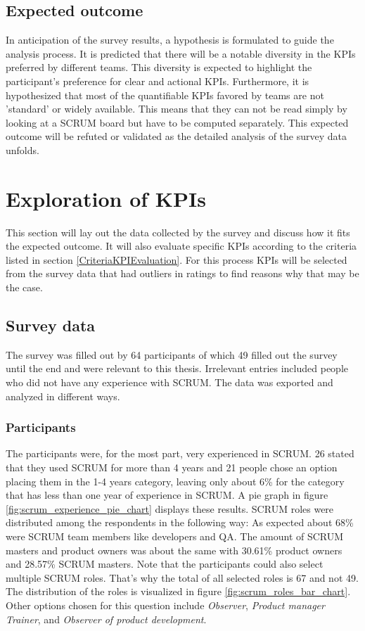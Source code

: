 \subsection{Expected outcome}
In anticipation of the survey results, 
a hypothesis is formulated to guide the analysis process. 
It is predicted that there will be a notable diversity in the 
KPIs preferred by different teams. 
This diversity is expected to highlight the participant's 
preference for clear and actional KPIs. Furthermore, 
it is hypothesized that most of the quantifiable KPIs 
favored by teams are not 'standard' or widely available. 
This means that they can not be read simply by looking at a 
SCRUM board but have to be computed separately.
This expected outcome will be refuted or validated as the 
detailed analysis of the survey data unfolds. 

\newpage

\section{Exploration of KPIs}

This section will lay out the data collected by the survey and discuss how it fits the expected outcome. 
It will also evaluate specific KPIs according to the criteria listed in section \ref{CriteriaKPIEvaluation}.
For this process KPIs will be selected from the survey data that had outliers in ratings to find reasons why that may be the case. 

\subsection{Survey data}\label{kpi-survey-results}

The survey was filled out by 64 participants of which 49 filled out the survey until the end and were relevant to this thesis. Irrelevant entries included people who did not have any experience with SCRUM. The data was exported and analyzed in different ways.

\subsubsection{Participants}

The participants were, for the most part, very experienced in SCRUM. 
26 stated that they used SCRUM for more than 4 years and 21 people chose an option placing them in the 1-4 years category, 
leaving only about 6\% for the category that has less than one year of experience in SCRUM. 
A pie graph in figure \ref{fig:scrum_experience_pie_chart} displays these results. 
SCRUM roles were distributed among the respondents in the following way: 
As expected about 68\% were SCRUM team members like developers and QA. 
The amount of SCRUM masters and product owners was about the same with 30.61\% product owners and 28.57\% 
SCRUM masters. 
Note that the participants could also select multiple SCRUM roles. 
That's why the total of all selected roles is 67 and not 49. 
The distribution of the roles is visualized in figure \ref{fig:scrum_roles_bar_chart}. 
Other options chosen for this question include \textit{Observer}, \textit{Product manager} \textit{Trainer}, and \textit{Observer of product development}.

